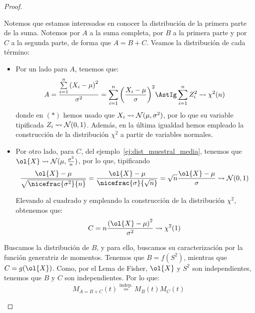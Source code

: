 \begin{coro}
\begin{proof}
\begin{enumerate}
            Notemos que estamos interesados en conocer la distribución de la primera parte de la suma. Notemos por $A$ a la suma completa, por $B$ a la primera parte y por $C$ a la segunda parte, de forma que $A=B+C$.            
            Veamos la distribución de cada término:
            \begin{itemize}
                \item Por un lado para $A$, tenemos que:
                \begin{equation*}
                    A = \dfrac{\sum\limits_{i=1}^n {(X_i - \mu)}^{2}}{\sigma^2} =
                    \sum\limits_{i=1}^n {\left(\dfrac{X_i - \mu}{\sigma}\right)}^{2} \AstIg \sum\limits_{i=1}^n Z_i^2 \rightsquigarrow \chi^2(n)
                \end{equation*}
                donde en $(\ast)$ hemos usado que $X_i\rightsquigarrow \mathcal{N}(\mu, \sigma^2)$, por lo que su variable tipificada $Z_i\rightsquigarrow \mathcal{N}(0,1)$. Además, en la última igualdad hemos empleado la construcción de la distribución $\chi^2$ a partir de variables normales.
                \item Por otro lado, para $C$, del ejemplo~\ref{ej:dist_muestral_media}, tenemos que $\ol{X}\rightsquigarrow \cc{N}(\mu, \frac{\sigma^2}{n})$, por lo que, tipificando 
                \begin{equation*}
                    \dfrac{\ol{X}-\mu}{\sqrt{\nicefrac{\sigma^2}{n}}} = \dfrac{\ol{X}-\mu}{\nicefrac{\sigma}{\sqrt{n}}}=\sqrt{n}\dfrac{\ol{X}-\mu}{\sigma} \rightsquigarrow \cc{N}(0,1)
                \end{equation*}

                Elevando al cuadrado y empleando la construcción de la distribución $\chi^2$, obtenemos que:
                \begin{equation*}
                    C = n\dfrac{{(\ol{X}-\mu)}^{2}}{\sigma^2} \rightsquigarrow \chi^2(1)
                \end{equation*}
            \end{itemize}

            Buscamos la distribución de $B$, y para ello, buscamos su caracterización por la función generatriz de momentos. Tenemos que $B=f(S^2)$, mientras que $C=g(\ol{X})$. Como, por el Lema de Fisher, $\ol{X}$ y $S^2$ son independientes, tenemos que $B$ y $C$ son independientes. Por lo que:
            \begin{equation*}
                M_{A=B+C}(t) \stackrel{\text{indep.}}{=} M_B(t) M_C(t)
            \end{equation*}


\end{enumerate}
\end{proof}
\end{coro}
